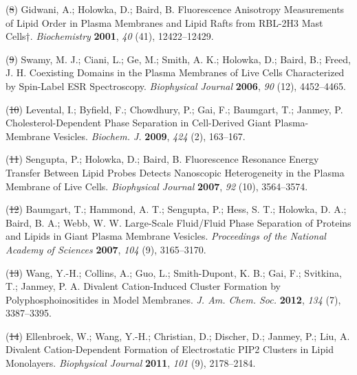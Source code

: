 \documentclass[11pt,notitlepage]{article}
\providecommand{\DIFaddtex}[1]{{\protect\color{blue}\uwave{#1}}} %
\providecommand{\DIFdeltex}[1]{{\protect\color{red}\sout{#1}}}                      %
\providecommand{\DIFaddbegin}{} %
\providecommand{\DIFaddend}{} %
\providecommand{\DIFdelbegin}{} %
\providecommand{\DIFdelend}{} %
\providecommand{\DIFadd}[1]{\texorpdfstring{\DIFaddtex{#1}}{#1}} %
\providecommand{\DIFdel}[1]{\texorpdfstring{\DIFdeltex{#1}}{}} %
\newcommand{\DIFscaledelfig}{0.5}
\newlength{\DIFdelgraphicswidth} %
\newlength{\DIFdelgraphicsheight} %
\newcommand{\DIFaddincludegraphics}[2][]{{\color{blue}\fbox{\DIFOincludegraphics[#1]{#2}}}} %
\newcommand{\DIFdelincludegraphics}[2][]{%
\sbox{\DIFdelgraphicsbox}{\DIFOincludegraphics[#1]{#2}}%
\settoboxwidth{\DIFdelgraphicswidth}{\DIFdelgraphicsbox} %
\settoboxtotalheight{\DIFdelgraphicsheight}{\DIFdelgraphicsbox} %
\scalebox{\DIFscaledelfig}{%
\parbox[b]{\DIFdelgraphicswidth}{\usebox{\DIFdelgraphicsbox}\\[-\baselineskip] \rule{\DIFdelgraphicswidth}{0em}}\llap{\resizebox{\DIFdelgraphicswidth}{\DIFdelgraphicsheight}{%
\setlength{\unitlength}{\DIFdelgraphicswidth}%
\begin{picture}(1,1)%
\thicklines\linethickness{2pt} %
{\color[rgb]{1,0,0}\put(0,0){\framebox(1,1){}}}%
{\color[rgb]{1,0,0}\put(0,0){\line( 1,1){1}}}%
{\color[rgb]{1,0,0}\put(0,1){\line(1,-1){1}}}%
\end{picture}%
}\hspace*{3pt}}} %
} %
\DeclareRobustCommand{\DIFaddbegin}{\DIFOaddbegin \let\includegraphics\DIFaddincludegraphics} %
\DeclareRobustCommand{\DIFaddend}{\DIFOaddend \let\includegraphics\DIFOincludegraphics} %
\DeclareRobustCommand{\DIFdelbegin}{\DIFOdelbegin \let\includegraphics\DIFdelincludegraphics} %
\DeclareRobustCommand{\DIFdelend}{\DIFOaddend \let\includegraphics\DIFOincludegraphics} %
\begin{document}
\leavevmode\hypertarget{ref-GGtK2c0N}{}%
(\DIFdelbegin \DIFdel{8}\DIFdelend \DIFaddbegin \DIFadd{5}\DIFaddend ) Gidwani, A.; Holowka, D.; Baird, B. Fluorescence Anisotropy
Measurements of Lipid Order in Plasma Membranes and Lipid Rafts from
RBL-2H3 Mast Cells†. \emph{Biochemistry} \textbf{2001}, \emph{40} (41),
12422--12429.

\leavevmode\hypertarget{ref-1Eg1Hzju1}{}%
(\DIFdelbegin \DIFdel{9}\DIFdelend \DIFaddbegin \DIFadd{6}\DIFaddend ) Swamy, M. J.; Ciani, L.; Ge, M.; Smith, A. K.; Holowka, D.; Baird,
B.; Freed, J. H. Coexisting Domains in the Plasma Membranes of Live
Cells Characterized by Spin-Label ESR Spectroscopy. \emph{Biophysical
Journal} \textbf{2006}, \emph{90} (12), 4452--4465.

\leavevmode\hypertarget{ref-oBaB5Z87}{}%
(\DIFdelbegin \DIFdel{10}\DIFdelend \DIFaddbegin \DIFadd{7}\DIFaddend ) Levental, I.; Byfield, F.; Chowdhury, P.; Gai, F.; Baumgart, T.;
Janmey, P. Cholesterol-Dependent Phase Separation in Cell-Derived Giant
Plasma-Membrane Vesicles. \emph{Biochem. J.} \textbf{2009}, \emph{424}
(2), 163--167.

\leavevmode\hypertarget{ref-BzP79Vj9}{}%
(\DIFdelbegin \DIFdel{11}\DIFdelend \DIFaddbegin \DIFadd{8}\DIFaddend ) Sengupta, P.; Holowka, D.; Baird, B. Fluorescence Resonance Energy
Transfer Between Lipid Probes Detects Nanoscopic Heterogeneity in the
Plasma Membrane of Live Cells. \emph{Biophysical Journal} \textbf{2007},
\emph{92} (10), 3564--3574.

\leavevmode\hypertarget{ref-aiu6Tmil}{}%
(\DIFdelbegin \DIFdel{12}\DIFdelend \DIFaddbegin \DIFadd{9}\DIFaddend ) Baumgart, T.; Hammond, A. T.; Sengupta, P.; Hess, S. T.; Holowka, D.
A.; Baird, B. A.; Webb, W. W. Large-Scale Fluid/Fluid Phase Separation
of Proteins and Lipids in Giant Plasma Membrane Vesicles.
\emph{Proceedings of the National Academy of Sciences} \textbf{2007},
\emph{104} (9), 3165--3170.

\leavevmode\hypertarget{ref-LhOwGz4k}{}%
(\DIFdelbegin \DIFdel{13}\DIFdelend \DIFaddbegin \DIFadd{10}\DIFaddend ) Wang, Y.-H.; Collins, A.; Guo, L.; Smith-Dupont, K. B.; Gai, F.;
Svitkina, T.; Janmey, P. A. Divalent Cation-Induced Cluster Formation by
Polyphosphoinositides in Model Membranes. \emph{J. Am. Chem. Soc.}
\textbf{2012}, \emph{134} (7), 3387--3395.

\leavevmode\hypertarget{ref-10CqL9t0a}{}%
(\DIFdelbegin \DIFdel{14}\DIFdelend \DIFaddbegin \DIFadd{11}\DIFaddend ) Ellenbroek, W.; Wang, Y.-H.; Christian, D.; Discher, D.; Janmey,
P.; Liu, A. Divalent Cation-Dependent Formation of Electrostatic PIP2
Clusters in Lipid Monolayers. \emph{Biophysical Journal} \textbf{2011},
\emph{101} (9), 2178--2184.
\end{document}
